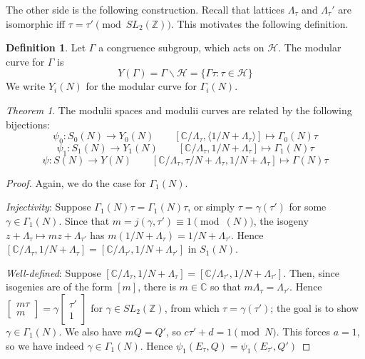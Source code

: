 \documentclass[11pt]{article}
\theoremstyle{plain}
\theoremstyle{definition}
\newtheorem{definition}{Definition}[section]
\theoremstyle{example}
\theoremstyle{remark}
\theoremstyle{lemma}
\theoremstyle{proposition}
\theoremstyle{Problem}
\theoremstyle{Solution}
\theoremstyle{theorem}
\newtheorem{theorem}{Theorem}[section]
\theoremstyle{corollary}
\begin{document}
The other side is the following construction. Recall that lattices $\Lambda_\tau$ and $\Lambda_\tau'$ are isomorphic iff $\tau = \tau' \pmod{SL_2(\mathbb{Z})}$. This motivates the following definition.
\begin{definition}
Let $\Gamma$ a congruence subgroup, which acts on $\mathcal{H}$. The modular curve for $\Gamma$ is 
$$Y(\Gamma)  = \Gamma\backslash\mathcal{H} = \{\Gamma\tau : \tau\in\mathcal{H}\}$$
We write $Y_i(N)$ for the modular curve for $\Gamma_i(N)$.
\end{definition}

\begin{theorem}
The modulii spaces and modulii curves are related by the following bijections:
$$\psi_0: S_0(N) \to Y_0(N) \qquad [\mathbb{C}/\Lambda_\tau, \langle 1/N + \Lambda_\tau\rangle] \mapsto \Gamma_0(N)\tau$$
$$\psi_1: S_1(N) \to Y_1(N) \qquad [\mathbb{C}/\Lambda_\tau, 1/N + \Lambda_\tau] \mapsto \Gamma_1(N)\tau$$
$$\psi: S(N) \to Y(N) \qquad [\mathbb{C}/\Lambda_\tau, \tau/N + \Lambda_\tau, 1/N+\Lambda_\tau] \mapsto \Gamma(N)\tau$$
\end{theorem}
\begin{proof}
Again, we do the case for $\Gamma_1(N)$.

\textit{Injectivity}: Suppose $\Gamma_1(N)\tau = \Gamma_1(N)\tau$, or simply $\tau = \gamma(\tau')$ for some $\gamma\in\Gamma_1(N)$. Since that $m=j(\gamma, \tau') \equiv 1 \pmod{(N)}$, the isogeny $z+\Lambda_\tau \mapsto mz+\Lambda_{\tau'}$ has $m(1/N+\Lambda_\tau) = 1/N + \Lambda_{\tau'}$. Hence $[\mathbb{C}/\Lambda_\tau, 1/N+\Lambda_\tau] = [\mathbb{C}/\Lambda_{\tau'}, 1/N+\Lambda_{\tau'}]$ in $S_1(N)$.

\textit{Well-defined}: Suppose $[\mathbb{C}/\Lambda_\tau, 1/N+\Lambda_\tau] = [\mathbb{C}/\Lambda_{\tau'}, 1/N+\Lambda_{\tau'}]$. Then, since isogenies are of the form $[m]$, there is $m\in \mathbb{C}$ so that $m\Lambda_{\tau} = \Lambda_{\tau'}$. Hence $\begin{bmatrix}m\tau \\ m\end{bmatrix} =\gamma\begin{bmatrix} \tau'\\ 1\end{bmatrix}$ for $\gamma\in SL_2(\mathbb{Z})$, from which $\tau=\gamma(\tau')$; the goal is to show $\gamma\in\Gamma_1(N)$. We also have $mQ=Q'$, so $c\tau'+d = 1 \pmod{N}$. This forces $a=1$, so we have indeed $\gamma\in\Gamma_1(N)$. Hence $\psi_1(E_\tau, Q)=\psi_1(E_{\tau'}, Q')$
\end{proof}
\end{document}
